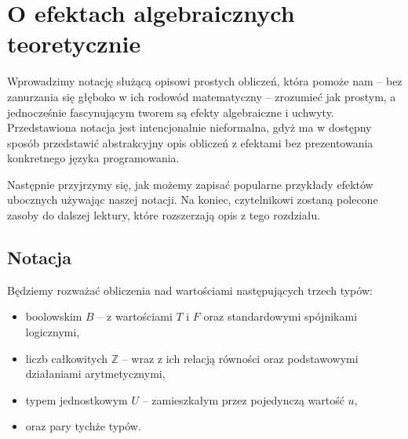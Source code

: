
\chapter{O efektach algebraicznych teoretycznie}

Wprowadzimy notację służącą opisowi prostych obliczeń, która pomoże nam -- bez zanurzania się głęboko w ich rodowód matematyczny -- zrozumieć jak prostym, a jednocześnie fascynującym tworem są efekty algebraiczne i uchwyty. Przedstawiona notacja jest intencjonalnie nieformalna, gdyż ma w dostępny sposób przedstawić abstrakcyjny opis obliczeń z efektami bez prezentowania konkretnego języka programowania.

Następnie przyjrzymy się, jak możemy zapisać popularne przykłady efektów ubocznych używając naszej notacji. Na koniec, czytelnikowi zostaną polecone zasoby do dalszej lektury, które rozszerzają opis z tego rozdziału.

\section{Notacja}

\newcommand{\return}[1]{\mathbf{return}\ #1}
\newcommand{\op}[3]{#1(#2, #3)}
\newcommand{\opi}[3]{\op{op_{#1}}{#2}{#3}}
\newcommand{\handle}[2]{\mathbf{handle}\ #1\ \mathbf{with}\ #2}
\newcommand{\hcase}[3]{#1\ #2\ \Rightarrow\ #3}
\newcommand{\fun}[2]{\lambda #1.\ #2}
\newcommand{\cond}[3]{\mathbf{if}\ #1\ \mathbf{then}\ #2\ \mathbf{else}\ #3}

Będziemy rozważać obliczenia nad wartościami następujących trzech typów:
\begin{itemize}
\item boolowskim \(B\) -- z wartościami \(T\) i \(F\) oraz standardowymi spójnikami logicznymi,
\item liczb całkowitych \(\mathbb{Z}\) -- wraz z ich relacją równości oraz podstawowymi działaniami arytmetycznymi,
\item typem jednostkowym \(U\) -- zamieszkałym przez pojedynczą wartość \(u\),
\item oraz pary tychże typów.
\end{itemize}

% 
% 

